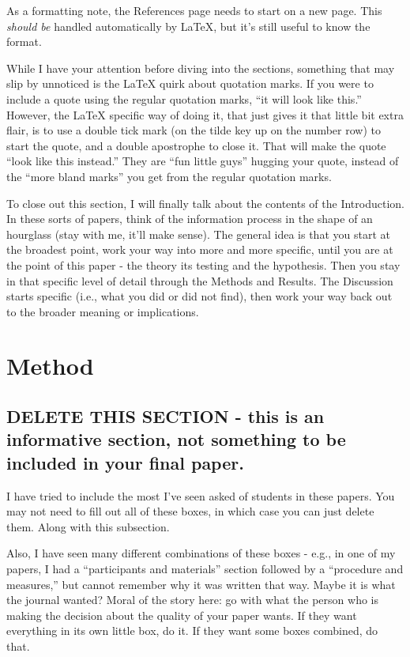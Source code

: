 \documentclass[stu,12pt,floatsintext]{apa7}
\begin{document}
As a formatting note, the References page needs to start on a new page. This \textit{should be} handled automatically by \LaTeX{}, but it's still useful to know the format.

While I have your attention before diving into the sections, something that may slip by unnoticed is the \LaTeX{} quirk about quotation marks. If you were to include a quote using the regular quotation marks, ``it will look like this.'' However, the \LaTeX{} specific way of doing it, that just gives it that little bit extra flair, is to use a double tick mark (on the tilde key up on the number row) to start the quote, and a double apostrophe to close it. That will make the quote ``look like this instead.'' They are ``fun little guys'' hugging your quote, instead of the ``more bland marks'' you get from the regular quotation marks.

To close out this section, I will finally talk about the contents of the Introduction. In these sorts of papers, think of the information process in the shape of an hourglass (stay with me, it'll make sense). The general idea is that you start at the broadest point, work your way into more and more specific, until you are at the point of this paper - the theory its testing and the hypothesis. Then you stay in that specific level of detail through the Methods and Results. The Discussion starts specific (i.e., what you did or did not find), then work your way back out to the broader meaning or implications.

\renewcommand{\theenumi}{\arabic{enumi}}
\renewcommand{\labelenumi}{\theenumi.}
\section{Method}

\subsection{DELETE THIS SECTION - this is an informative section, not something to be included in your final paper.}

I have tried to include the most I've seen asked of students in these papers. You may not need to fill out all of these boxes, in which case you can just delete them. Along with this subsection.

Also, I have seen many different combinations of these boxes - e.g., in one of my papers, I had a ``participants and materials'' section followed by a ``procedure and measures,'' but cannot remember why it was written that way. Maybe it is what the journal wanted? Moral of the story here: go with what the person who is making the decision about the quality of your paper wants. If they want everything in its own little box, do it. If they want some boxes combined, do that.
\end{document}
